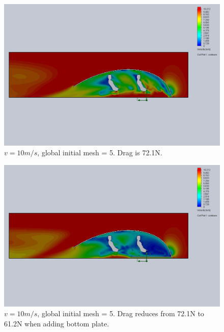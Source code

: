 \documentclass[11pt]{article}
\begin{document}
\begin{figure}[ht]
\includegraphics[width=\textwidth]{gm_5_rf_7_v10_roof3_v2.png}
\caption{$v = 10 m/s$, global initial mesh = 5. Drag is 72.1N.}
\end{figure}

\begin{figure}[ht]
\includegraphics[width=\textwidth]{gm_5_rf_7_v10_roof3_v3.png}
\caption{$v = 10 m/s$, global initial mesh = 5. Drag reduces from 72.1N to 61.2N when adding bottom plate.}
\end{figure}
\end{document}
